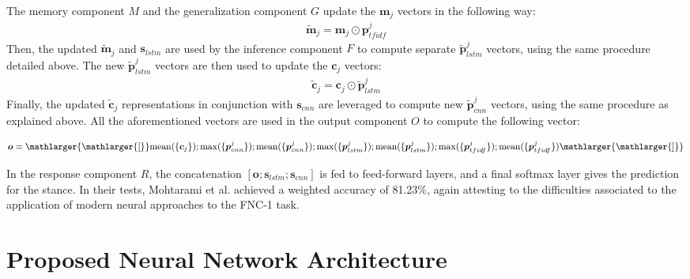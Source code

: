 The memory component $M$ and the generalization component $G$ update the $\boldsymbol{m}_j$ vectors in the following way:
\begin{equation}
\begin{split}
\boldsymbol{\tilde{m}}_j = \boldsymbol{m}_j \odot \boldsymbol{p}^j_{tfidf}
\end{split}
\end{equation}
Then, the updated $\boldsymbol{\tilde{m}}_j$ and $\boldsymbol{s}_{lstm}$ are used by the inference component $F$ to compute separate $\boldsymbol{\tilde{p}}^j_{lstm}$ vectors, using the same procedure detailed above. The new $\boldsymbol{\tilde{p}}^j_{lstm}$ vectors are then used to update the $\boldsymbol{c}_j$ vectors:
\begin{equation}
\begin{split}
\boldsymbol{\tilde{c}}_j = \boldsymbol{c}_j \odot \boldsymbol{\tilde{p}}^j_{lstm}
\end{split}
\end{equation}
Finally, the updated $\boldsymbol{\tilde{c}}_j$ representations in conjunction with $\boldsymbol{s}_{cnn}$ are leveraged to compute new $\boldsymbol{\tilde{p}}^j_{cnn}$ vectors, using the same procedure as explained above. All the aforementioned vectors are used in the output component $O$ to compute the following vector:

\begin{equation}
\small
\boldsymbol{o} = \mathlarger{\mathlarger{[}}\mathrm{mean}(\{\boldsymbol{c}_j\}); 
\mathrm{max}(\{\boldsymbol{p}^j_{cnn}\}); \mathrm{mean}(\{\boldsymbol{p}^j_{cnn}\}); 
\mathrm{max}(\{\boldsymbol{p}^j_{lstm}\}); \mathrm{mean}(\{\boldsymbol{p}^j_{lstm}\}); \mathrm{max}(\{\boldsymbol{p}^j_{tfidf}\}); \mathrm{mean}(\{\boldsymbol{p}^j_{tfidf}\}) \mathlarger{\mathlarger{]}}
\end{equation}

In the response component $R$, the concatenation $[\boldsymbol{o}; \boldsymbol{s}_{lstm}; \boldsymbol{s}_{cnn}]$ is fed to feed-forward layers, and a final softmax layer gives the prediction for the stance. In their tests, Mohtarami et al. achieved a weighted accuracy of 81.23\%, again attesting to the difficulties associated to the application of modern neural approaches to the FNC-1 task.

\section{Proposed Neural Network Architecture}

